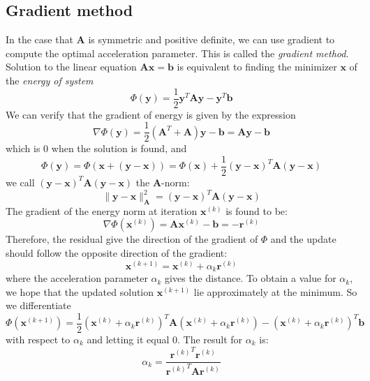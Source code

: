 \documentclass{article}
\begin{document}
\subsection{Gradient method}
In the case that $\mathbf{A}$ is symmetric and positive definite, we can use gradient
to compute the optimal acceleration parameter. This is called the 
\emph{gradient method}. 
Solution to the linear equation $\mathbf{A}\mathbf{x} = \mathbf{b}$ is equivalent 
to finding the minimizer $\mathbf{x}$ of the \emph{energy of system}
\begin{equation}
    \Phi(\mathbf{y}) 
    = \frac{1}{2}\mathbf{y}^T \mathbf{A} \mathbf{y} - \mathbf{y}^T \mathbf{b}
\end{equation}
We can verify that the gradient of energy is given by the expression
\begin{equation*}
    \nabla \Phi(\mathbf{y}) = \frac{1}{2} (\mathbf{A}^T + \mathbf{A}) \mathbf{y} - \mathbf{b}
     = \mathbf{A} \mathbf{y} - \mathbf{b}
\end{equation*}
which is 0 when the solution is found, and
\begin{equation*}
    \Phi(\mathbf{y}) = \Phi(\mathbf{x} + (\mathbf{y} - \mathbf{x}))
    = \Phi(\mathbf{x}) + \frac{1}{2} (\mathbf{y} - \mathbf{x}) ^T \mathbf{A} (\mathbf{y} - \mathbf{x})
\end{equation*}
we call $(\mathbf{y} - \mathbf{x}) ^T \mathbf{A} (\mathbf{y} - \mathbf{x})$ 
the $\mathbf{A}$-norm: 
\begin{equation*}
    \|\mathbf{y} - \mathbf{x}\|^2_{\mathbf{A}} 
    = (\mathbf{y} - \mathbf{x}) ^T \mathbf{A} (\mathbf{y} - \mathbf{x})
\end{equation*} 
The gradient of the energy norm at iteration $\mathbf{x}^{(k)}$ is found to be:
\begin{equation*}
    \nabla \Phi(\mathbf{x}^{(k)}) = \mathbf{A} \mathbf{x}^{(k)} - \mathbf{b} = -\mathbf{r}^{(k)}
\end{equation*}
Therefore, the residual give the direction of the gradient of $\Phi$ and the 
update should follow the opposite direction of the gradient:
\begin{equation}
    \mathbf{x}^{(k+1)} = \mathbf{x}^{(k)} + \alpha_k \mathbf{r}^{(k)}
\end{equation}
where the acceleration parameter $\alpha_k$ gives the distance. 
To obtain a value for $\alpha_k$, 
we hope that the updated solution $\mathbf{x}^{(k+1)}$ lie approximately at the minimum. So we 
differentiate
\begin{equation*}
    \Phi(\mathbf{x}^{(k+1)}) 
    = \frac{1}{2}(\mathbf{x}^{(k)} + \alpha_k \mathbf{r}^{(k)})^T 
    \mathbf{A} (\mathbf{x}^{(k)} + \alpha_k \mathbf{r}^{(k)}) 
    - (\mathbf{x}^{(k)} + \alpha_k \mathbf{r}^{(k)})^T \mathbf{b}
\end{equation*}
with respect to $\alpha_k$ and letting it equal 0. The result for $\alpha_k$ is:
\begin{equation}
    \label{alpha_k}
    \alpha_k = 
    \frac{\left.\mathbf{r}^{(k)}\right.^T \mathbf{r}^{(k)}}
    {\left.\mathbf{r}^{(k)}\right.^T \mathbf{A} \mathbf{r}^{(k)}}
\end{equation}
\end{document}
